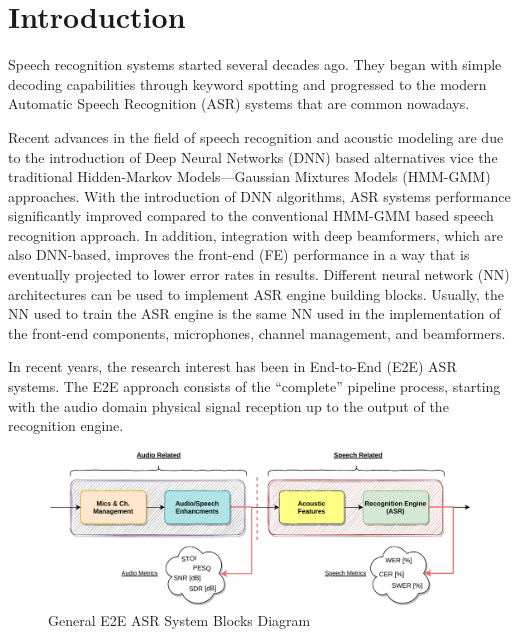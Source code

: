 \chapter{Introduction}
Speech recognition systems
started several decades ago.
They began with simple decoding capabilities through keyword
spotting and progressed to the modern Automatic Speech Recognition (ASR) systems
that are common nowadays\cite{asrBriefHistory}.

Recent advances in the field of speech recognition 
and acoustic modeling are
due to the introduction of 
Deep Neural Networks (DNN) 
based alternatives vice the traditional
Hidden-Markov Models---Gaussian Mixtures Models (HMM-GMM) 
approaches\cite{7472778, 6296526}.
With the introduction of DNN algorithms,
ASR systems performance significantly improved
compared to the conventional HMM-GMM 
based speech recognition approach\cite{7472778, 6296526}.
In addition, integration with deep beamformers,
which are also DNN-based, improves
the front-end (FE) performance in a way that is
eventually projected to lower error rates in results.
Different neural network (NN) 
architectures can be used to
implement ASR engine building blocks.
Usually, the NN used to train the ASR engine 
is the same NN used
in the implementation of the
front-end components, microphones, channel management,
and beamformers.

In recent years, the research
interest has been in 
End-to-End (E2E) ASR systems\cite{boeddeker2018exploring}.
The E2E approach consists of the ``complete'' pipeline process, starting with
the audio domain physical signal reception up to the 
output of the recognition engine.

\begin{figure}[H]
	\centering
	\includegraphics[width=\linewidth]{Introduction/images/asr_blocks}
	\caption{General E2E ASR System Blocks Diagram}\label{fig:asr_blocks_diagram}
\end{figure}
\vspace{-0.5cm}


